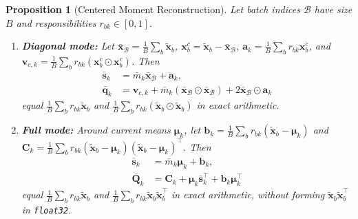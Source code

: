 \documentclass[10pt]{article} %
\newtheorem{proposition}{Proposition}
\begin{document}
\begin{proposition}[Centered Moment Reconstruction]
\label{prop:centered}
Let batch indices $\mathcal{B}$ have size $B$ and responsibilities $r_{bk} \in [0, 1]$.
\begin{enumerate}[leftmargin=*,nosep]
  \item \textbf{Diagonal mode:} Let $\bar{\mathbf{x}}_{\mathcal{B}} = \frac{1}{B}\sum_{b}\tilde{\mathbf{x}}_b$, $\mathbf{x}^c_b = \tilde{\mathbf{x}}_b - \bar{\mathbf{x}}_{\mathcal{B}}$, $\mathbf{a}_k = \frac{1}{B}\sum_{b} r_{bk} \mathbf{x}^c_b$, and $\mathbf{v}_{c,k} = \frac{1}{B}\sum_{b} r_{bk}(\mathbf{x}^c_b \odot \mathbf{x}^c_b)$. Then
  \begin{align}
  \bar{\mathbf{s}}_k &= \bar{m}_k \bar{\mathbf{x}}_{\mathcal{B}} + \mathbf{a}_k, \label{eq:diag_reconstruct_s}\\
  \bar{\mathbf{q}}_k &= \mathbf{v}_{c,k} + \bar{m}_k (\bar{\mathbf{x}}_{\mathcal{B}} \odot \bar{\mathbf{x}}_{\mathcal{B}}) + 2 \bar{\mathbf{x}}_{\mathcal{B}} \odot \mathbf{a}_k \label{eq:diag_reconstruct_q}
  \end{align}
  equal $\frac{1}{B}\sum_{b} r_{bk} \tilde{\mathbf{x}}_b$ and $\frac{1}{B}\sum_{b} r_{bk}(\tilde{\mathbf{x}}_b \odot \tilde{\mathbf{x}}_b)$ in exact arithmetic.
  \item \textbf{Full mode:} Around current means $\boldsymbol{\mu}_k$, let $\mathbf{b}_k = \frac{1}{B}\sum_{b} r_{bk}(\tilde{\mathbf{x}}_b - \boldsymbol{\mu}_k)$ and $\mathbf{C}_k = \frac{1}{B}\sum_{b} r_{bk}(\tilde{\mathbf{x}}_b - \boldsymbol{\mu}_k)(\tilde{\mathbf{x}}_b - \boldsymbol{\mu}_k)^\top$. Then
  \begin{align}
  \bar{\mathbf{s}}_k &= \bar{m}_k \boldsymbol{\mu}_k + \mathbf{b}_k, \label{eq:full_reconstruct_s}\\
  \bar{\mathbf{Q}}_k &= \mathbf{C}_k + \boldsymbol{\mu}_k \bar{\mathbf{s}}_k^\top + \mathbf{b}_k \boldsymbol{\mu}_k^\top \label{eq:full_reconstruct_q}
  \end{align}
  equal $\frac{1}{B}\sum_{b} r_{bk} \tilde{\mathbf{x}}_b$ and $\frac{1}{B}\sum_{b} r_{bk} \tilde{\mathbf{x}}_b \tilde{\mathbf{x}}_b^\top$ in exact arithmetic, without forming $\tilde{\mathbf{x}}_b\tilde{\mathbf{x}}_b^\top$ in \texttt{float32}.
\end{enumerate}
\end{proposition}
\end{document}
